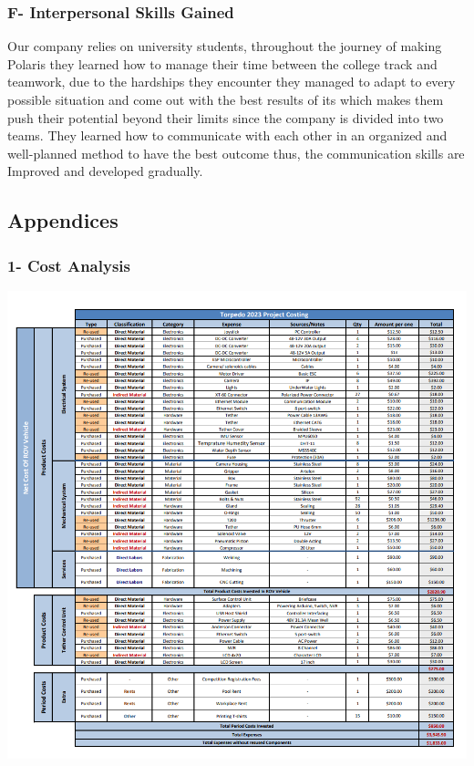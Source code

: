 \documentclass[a4paper,12pt,leqno]{report}
\begin{document}
\textcolor{blue!40}{
\subsubsection{F- Interpersonal Skills Gained}}
Our company relies on university students, throughout the journey of making Polaris they  learned how to manage their time between the college track and teamwork, due to the hardships  they encounter they managed to adapt to every possible situation and come out with the best  results of its which makes them push their potential beyond their limits since the company is  divided into two teams. They learned how to communicate with each other in an organized and  well-planned method to have the best outcome thus, the communication skills are Improved and  developed gradually. \\
\textcolor{blue!90}{
	\section{Appendices}}
\textcolor{blue!40}{
	\subsubsection{1- Cost Analysis }}
\includegraphics[width = \textwidth, height =.9\textheight]{Cost_analysis}
\end{document}
